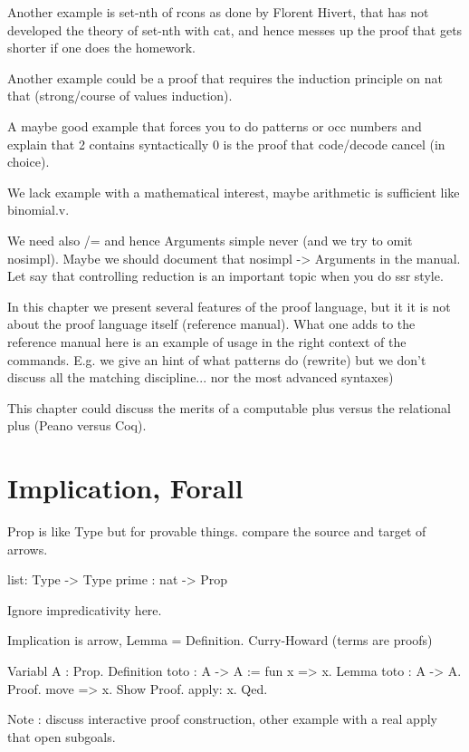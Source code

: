 Another example is set-nth of rcons as done by Florent Hivert, that has not
developed the theory of set-nth with cat, and hence messes up the proof
that gets shorter if one does the homework.

Another example could be a proof that requires the induction principle
on nat that (strong/course of values induction).

A maybe good example that forces you to do patterns or occ numbers and explain
that 2  contains syntactically 0 is the proof that code/decode cancel (in
choice).

We lack example with a mathematical interest, maybe arithmetic is sufficient like binomial.v.

We need also /= and hence Arguments simple never (and we try to omit nosimpl).
Maybe we should document that nosimpl -> Arguments in the manual.
Let say that controlling reduction is an important topic when you
do ssr style.

In this chapter we present several features of the proof language, but it it is
not about the proof language itself (reference manual). What one adds to the
reference manual here is an example of usage in the right context of the
commands.  E.g. we give an hint of what patterns do (rewrite) but we don't
discuss all the matching discipline... nor the most advanced syntaxes)

This chapter could discuss the merits of a computable plus versus
the relational plus (Peano versus Coq).


\section{Implication, Forall}

Prop is like Type but for provable things. compare the source and target of
arrows.

\begin{coq}{}
list: Type -> Type
prime : nat -> Prop
\end{coq}

Ignore impredicativity here.

Implication is arrow, Lemma = Definition.
Curry-Howard (terms are proofs)

\begin{coq}{}
Variabl A : Prop.
Definition toto : A -> A := fun x => x.
Lemma  toto : A -> A.
 Proof.
  move => x.
  Show Proof.
  apply: x.
 Qed.
\end{coq}
Note : 
discuss interactive proof construction, other example with a real
apply that open subgoals.

